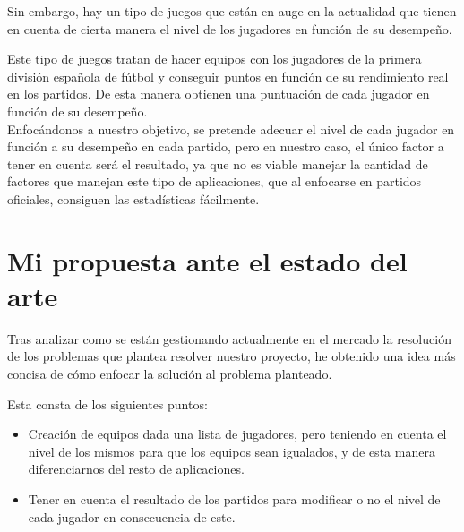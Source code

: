 Sin embargo, hay un tipo de juegos que están en auge en la actualidad que tienen en cuenta de cierta manera el nivel de los
jugadores en función de su desempeño.

Este tipo de juegos tratan de hacer equipos con los jugadores de la primera división española de fútbol y conseguir puntos en función
de su rendimiento real en los partidos. De esta manera obtienen una puntuación de cada jugador en función de su desempeño.\\

Enfocándonos a nuestro objetivo, se pretende adecuar el nivel de cada jugador en función a su desempeño en cada partido, pero en nuestro caso,
el único factor a tener en cuenta será el resultado, ya que no es viable manejar la cantidad de factores que manejan este tipo de aplicaciones,
que al enfocarse en partidos oficiales, consiguen las estadísticas fácilmente.

\section{Mi propuesta ante el estado del arte}

Tras analizar como se están gestionando actualmente en el mercado la resolución de los problemas que plantea resolver nuestro proyecto, he obtenido
una idea más concisa de cómo enfocar la solución al problema planteado.

Esta consta de los siguientes puntos:

\begin{itemize}
    \item Creación de equipos dada una lista de jugadores, pero teniendo en cuenta el nivel de los mismos para que los equipos sean igualados, y de esta manera diferenciarnos
    del resto de aplicaciones.
    \item Tener en cuenta el resultado de los partidos para modificar o no el nivel de cada jugador en consecuencia de este.
\end{itemize}
